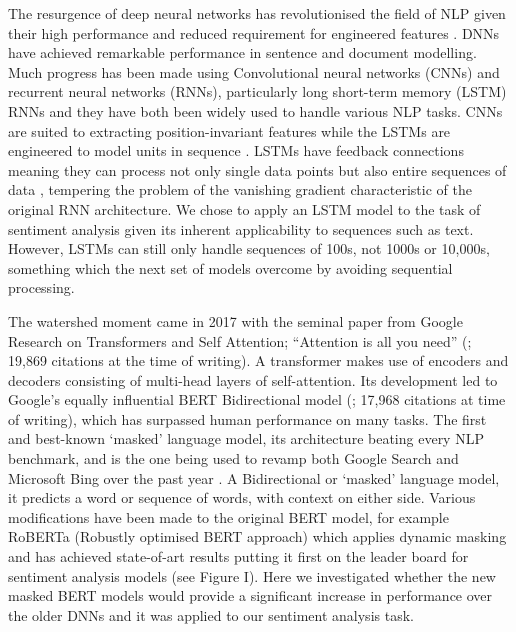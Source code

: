 \documentclass{svproc}
\begin{document}
The resurgence of deep neural networks has revolutionised the field of NLP given their high performance and reduced requirement for engineered features \citep{yin2017comparative}. DNNs have achieved remarkable performance in sentence and document modelling. Much progress has been made using Convolutional neural networks (CNNs) and recurrent neural networks (RNNs), particularly long short-term memory (LSTM) RNNs and they have both been widely used to handle various NLP tasks. CNNs are suited to extracting position-invariant features while the LSTMs are engineered to model units in sequence \citep{yin2017comparative}. LSTMs have feedback connections meaning they can process not only single data points but also entire sequences of data \citep{gers1999learning}, tempering the problem of the vanishing gradient characteristic of the original RNN architecture. We chose to apply an LSTM model to the task of sentiment analysis given its inherent applicability to sequences such as text. However, LSTMs can still only handle sequences of 100s, not 1000s or 10,000s, something which the next set of models overcome by avoiding sequential processing.

The watershed moment came in 2017 with the seminal paper from Google Research on Transformers and Self Attention; “Attention is all you need” (\cite{vaswani2017attention}; 19,869 citations at the time of writing). A transformer makes use of encoders and decoders consisting of multi-head layers of self-attention. Its development led to Google’s equally influential BERT Bidirectional model (\cite{devlin2018bert}; 17,968 citations at time of writing), which has surpassed human performance on many tasks. The first and best-known ‘masked’ language model, its architecture beating every NLP benchmark, and is the one being used to revamp both Google Search and Microsoft Bing over the past year \citep{carvalho2020evaluation}. A Bidirectional or ‘masked’ language model, it predicts a word or sequence of words, with context on either side. Various modifications have been made to the original BERT model, for example RoBERTa (Robustly optimised BERT approach) \citep{liu2019roberta} which applies dynamic masking and has achieved state-of-art results putting it first on the leader board for sentiment analysis models (see Figure I). Here we investigated whether the new masked BERT models would provide a significant increase in performance over the older DNNs and it was applied to our sentiment analysis task.
\end{document}
